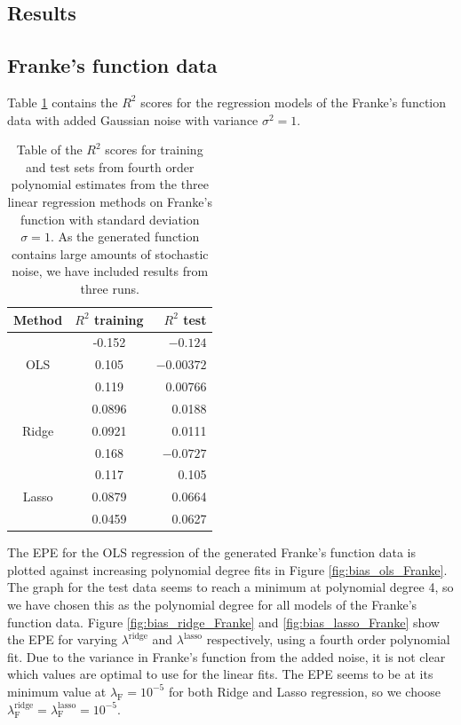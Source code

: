 \documentclass[a4paper, 10pt]{article}
\begin{document}
\begin{multicols}{2}
\section{Results}
\subsection{Franke's function data}
Table \ref{tab:R2_stddev=1} contains the $R^2$ scores for the regression models of the Franke's function data with added Gaussian noise with variance $\sigma^2 = 1$. 

\begin{table}[H]
\caption{Table of the $R^2$ scores for training and test sets from fourth order polynomial estimates from  the three linear regression methods on Franke's function with standard deviation $\sigma=1$. As the generated function contains large amounts of stochastic noise, we have included results from three runs.\vspace{2pt}}

\label{tab:R2_stddev=1}
\centering
\begin{tabular}{|c|c|r|} \hline 
Method & $R^2$ training & $R^2$ test \\ \hline
\multirow{3}{*}{OLS} & -0.152& $-0.124$\\ 
											& 0.105 & $-0.00372$ \\ 
											& 0.119   & 0.00766\\ \cline{1-3}
\multirow{3}{*}{Ridge} & 0.0896 & 0.0188\\ 
											& 0.0921   & 0.0111 \\ 
											& 0.168      & $-0.0727$\\ \cline{1-3}
\multirow{3}{*}{Lasso} & 0.117& 0.105\\ 
											& 0.0879   & 0.0664 \\ 
											& 0.0459 & 0.0627\\ \cline{1-3}
\end{tabular}
\end{table}

The EPE for the OLS regression of the generated Franke's function data is plotted against increasing polynomial degree fits in Figure \ref{fig:bias_ols_Franke}.  The graph for the test data seems to reach a minimum at polynomial degree 4, so we have chosen this as the polynomial degree for all models of the Franke's function data. Figure \ref{fig:bias_ridge_Franke} and \ref{fig:bias_lasso_Franke} show the EPE for varying $\lambda^\text{ridge}$ and $\lambda^\text{lasso}$ respectively, using a fourth order polynomial fit. Due to the variance in Franke's function from the added  noise, it is not clear which values are optimal to use for the linear fits. The EPE seems to be at its minimum value at $\lambda_\text{F}=10^{-5}$ for both Ridge and Lasso regression, so we choose $\lambda^\text{ridge}_\text{F} = \lambda^\text{lasso}_\text{F}=10^{-5}$.





\end{multicols}
\end{document}
